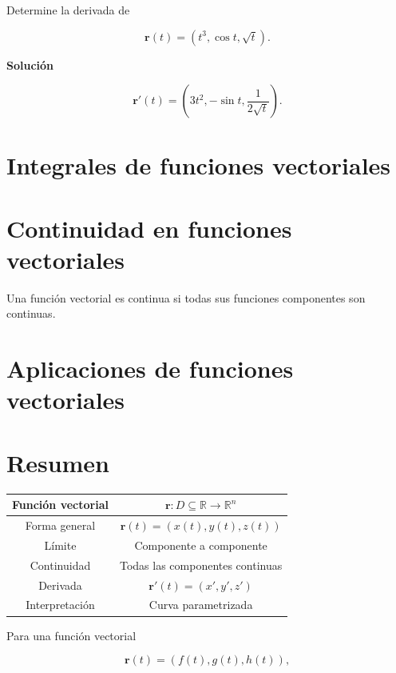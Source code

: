 \newpage

\begin{ejercicio}
Determine la derivada de

\[
\mathbf{r}(t)=
\left(
t^{3},
\cos t,
\sqrt{t}
\right).
\]

\textbf{Solución}

\[
\mathbf{r}'(t)=
\left(
3t^{2},
-\sin t,
\frac{1}{2\sqrt{t}}
\right).
\]
\end{ejercicio}

\section{Integrales de funciones vectoriales}

\section{Continuidad en funciones vectoriales}
Una función vectorial es continua si todas sus funciones componentes son continuas.


\section{Aplicaciones de funciones vectoriales}

\section{Resumen}

\begin{center}
\begin{tabular}{|c|c|}
\hline
Función vectorial & $\mathbf{r}:D\subseteq\mathbb{R}\rightarrow\mathbb{R}^{n}$\\
\hline
Forma general & $\mathbf{r}(t)=(x(t),y(t),z(t))$\\
\hline
Límite & Componente a componente\\
\hline
Continuidad & Todas las componentes continuas\\
\hline
Derivada & $\mathbf{r}'(t)=(x',y',z')$\\
\hline
Interpretación & Curva parametrizada\\
\hline
\end{tabular}
\end{center}

Para una función vectorial

\[
\mathbf{r}(t)=
\left(
f(t),g(t),h(t)
\right),
\]

